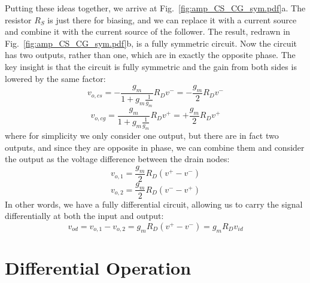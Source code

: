 Putting these ideas together, we arrive at Fig.~\ref{fig:amp_CS_CG_sym.pdf}a.  The resistor $R_S$ is just there for biasing, and we can replace it with a current source and combine it with the current source of the follower.  The result, redrawn in Fig.~\ref{fig:amp_CS_CG_sym.pdf}b, is a fully symmetric circuit.  Now the circuit has two outputs, rather than one, which are in exactly the opposite phase.  
The key insight is that the circuit is fully symmetric and the gain from both sides is lowered by the same factor:
    \begin{equation}
        v_{o,cs} = -\frac{g_m}{1+g_m \frac{1}{g_m} } R_D v^- = -\frac{g_m}{2} R_D v^-   
    \end{equation}
    \begin{equation}
        v_{o,cg} = \frac{g_m}{1+g_m \frac{1}{g_m} } R_D v^+ = +\frac{g_m}{2} R_D v^+   
    \end{equation}
where for simplicity we only consider one output, but there are in fact two outputs, and since they are opposite in phase, we can combine them and consider the output as the voltage difference between the drain nodes:
    \begin{equation}
        v_{o,1} = \frac{g_m}{2} R_D (v^+ - v^-)  
    \end{equation}
    \begin{equation}
        v_{o,2} = \frac{g_m}{2} R_D (v^- - v^+)  
    \end{equation}
In other words, we have a fully differential circuit, allowing us to carry the signal differentially at both the input and output:
    \begin{equation}
        v_{od} = v_{o,1} - v_{o,2} = g_m R_D (v^+ - v^-) = g_m R_D v_{id}  
    \end{equation}
\section{Differential Operation}
